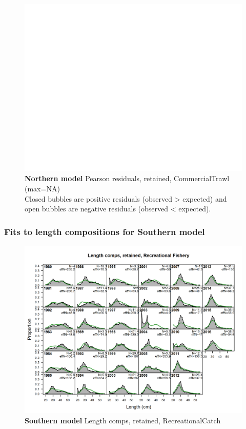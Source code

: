 \documentclass[12pt,]{article}
\begin{document}
\begin{figure}[htbp]
\centering
\includegraphics{./r4ss/plots_mod1/comp_gstlenfit_residsflt1mkt2.png}
\caption{\textbf{Northern model} Pearson residuals, retained,
CommercialTrawl (max=NA)\\
Closed bubbles are positive residuals (observed \textgreater{} expected)
and open bubbles are negative residuals (observed \textless{} expected).
\label{fig:mod1_40_comp_gstlenfit_residsflt1mkt2}}
\end{figure}

\FloatBarrier

\subsubsection{Fits to length compositions for Southern
model}\label{fits-to-length-compositions-for-southern-model}

\begin{figure}[htbp]
\centering
\includegraphics{./r4ss/plots_mod2/comp_lenfit_flt1mkt2.png}
\caption{\textbf{Southern model} Length comps, retained,
RecreationalCatch \label{fig:mod2_1_comp_lenfit_flt1mkt2}}
\end{figure}
\end{document}
